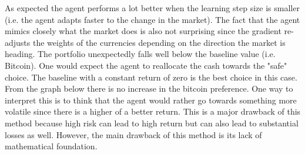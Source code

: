 \documentclass[a4paper,12pt]{article}
\begin{document}
As expected the agent performs a lot better when the learning step size is smaller (i.e. the agent adapts faster to the change in the market). The fact that the agent mimics closely what the market does is also not surprising since the gradient re-adjusts the weights of the currencies depending on the direction the market is heading. The portfolio unexpectedly falls well below the baseline value (i.e. Bitcoin). One would expect the agent to reallocate the cash towards the "safe" choice. The baseline with a constant return of zero is the best choice in this case. From the graph below there is no increase in the bitcoin preference. One way to interpret this is to think that the agent would rather go towards something more volatile since there is a higher of a better return. This is a major drawback of this method because high risk can lead to high return but can also lead to substantial losses as well. However, the main drawback of this method is its lack of mathematical foundation. 
\end{document}
